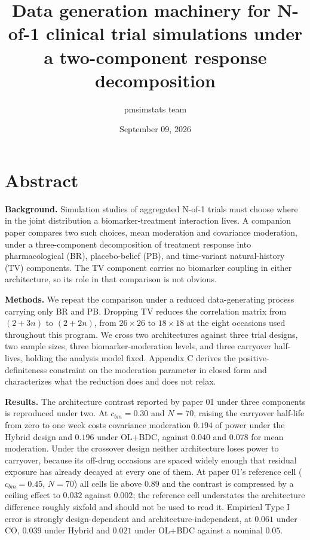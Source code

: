 \documentclass[
  11pt,
]{article}
\title{Data generation machinery for N-of-1 clinical trial simulations under a two-component response decomposition}
\author{pmsimstats team}
\date{September 09, 2026}
\begin{document}
\maketitle

{
\setcounter{tocdepth}{2}
\tableofcontents
}
\section{Abstract}

\textbf{Background.} Simulation studies of aggregated N-of-1 trials
must choose where in the joint distribution a biomarker-treatment
interaction lives. A companion paper compares two such choices, mean
moderation and covariance moderation, under a three-component
decomposition of treatment response into pharmacological (BR),
placebo-belief (PB), and time-variant natural-history (TV)
components. The TV component carries no biomarker coupling in either
architecture, so its role in that comparison is not obvious.

\textbf{Methods.} We repeat the comparison under a reduced
data-generating process carrying only BR and PB. Dropping TV reduces
the correlation matrix from \((2 + 3n)\) to \((2 + 2n)\), from \(26 \times
26\) to \(18 \times 18\) at the eight occasions used throughout this
program. We cross two architectures against three trial designs, two
sample sizes, three biomarker-moderation levels, and three carryover
half-lives, holding the analysis model fixed. Appendix C derives the
positive-definiteness constraint on the moderation parameter in
closed form and characterizes what the reduction does and does not
relax.

\textbf{Results.} The architecture contrast reported by paper 01 under
three components is reproduced under two. At \(c_{bm} = 0.30\) and
\(N = 70\), raising the carryover half-life from zero to one week costs
covariance moderation \(0.194\) of power under the Hybrid design and
\(0.196\) under OL+BDC, against \(0.040\) and \(0.078\) for mean
moderation. Under the crossover design neither architecture loses
power to carryover, because its off-drug occasions are spaced widely
enough that residual exposure has already decayed at every one of
them. At paper 01's reference cell (\(c_{bm} = 0.45\), \(N = 70\)) all
cells lie above \(0.89\) and the contrast is compressed by a ceiling
effect to \(0.032\) against \(0.002\); the reference cell understates the
architecture difference roughly sixfold and should not be used to
read it. Empirical Type I error is strongly design-dependent and
architecture-independent, at \(0.061\) under CO, \(0.039\) under Hybrid
and \(0.021\) under OL+BDC against a nominal \(0.05\).
\end{document}
